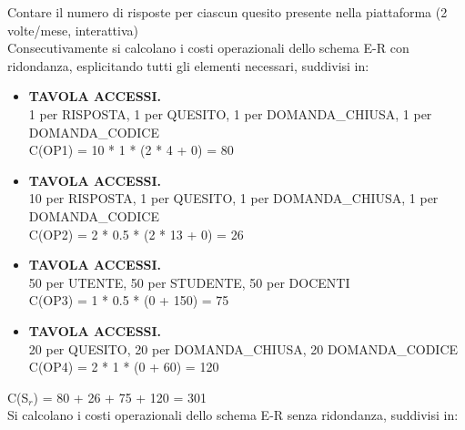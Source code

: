\documentclass{article}
\begin{document}
\hspace*{5pt}Contare il numero di risposte per ciascun quesito presente nella piattaforma (2 volte/mese, \hspace*{6pt}interattiva) \vspace*{7pt}\\
Consecutivamente si calcolano i costi operazionali dello schema E-R con ridondanza, esplicitando tutti gli elementi necessari, suddivisi in:
\begin{itemize}[label={ }]
    \itemsep0em 
    \item {\small\textbf{TAVOLA ACCESSI.} \\ 1 per RISPOSTA, 1 per QUESITO, 1 per DOMANDA\_CHIUSA, 1 per DOMANDA\_CODICE} \vspace*{2pt}\\ C(OP1) = 10 * 1 * (2 * 4 + 0) = 80 \vspace*{2pt} 
    \item {\small\textbf{TAVOLA ACCESSI.} \\ 10 per RISPOSTA, 1 per QUESITO, 1 per DOMANDA\_CHIUSA, 1 per DOMANDA\_CODICE} \vspace*{2pt}\\ C(OP2) = 2 * 0.5 * (2 * 13 + 0) = 26 \vspace*{2pt}
    \item {\small\textbf{TAVOLA ACCESSI.} \\ 50 per UTENTE, 50 per STUDENTE, 50 per DOCENTI} \vspace*{2pt}\\ C(OP3) = 1 * 0.5 * (0 + 150) = 75
    \item {\small\textbf{TAVOLA ACCESSI.} \\ 20 per QUESITO, 20 per DOMANDA\_CHIUSA, 20 DOMANDA\_CODICE } \vspace*{1pt}\\ C(OP4) = 2 * 1 * (0 + 60) = 120
\end{itemize}
\hspace*{15pt}C(S$_r$) = 80 + 26 + 75 + 120 = 301 \vspace*{7pt}\\
Si calcolano i costi operazionali dello schema E-R senza ridondanza, suddivisi in:
\end{document}

